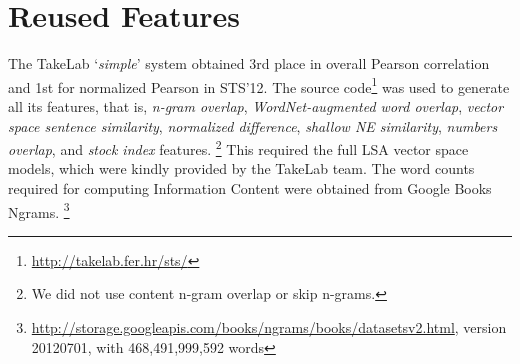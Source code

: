\section{Reused Features}
\label{reused}

The TakeLab `\emph{simple\/}' system \citep{vsaric2012takelab} 
obtained 3rd place in overall Pearson correlation 
and 1st for normalized Pearson in STS'12.
The source code\footnote{\url{http://takelab.fer.hr/sts/}} was used to generate 
all its features, that is,
\emph{n-gram overlap}, 
\emph{WordNet-augmented word overlap}, 
\emph{vector space sentence similarity}, 
\emph{normalized difference}, 
\emph{shallow NE similarity}, 
\emph{numbers overlap}, and 
\emph{stock index} features.%
\footnote{We did not use content n-gram overlap or skip n-grams.} 
This required the full LSA vector space models, which were kindly provided by the TakeLab team. 
The word counts required for computing Information Content were obtained from Google Books Ngrams.%
\footnote{\url{http://storage.googleapis.com/books/ngrams/books/datasetsv2.html}, 
version 20120701, with 468,491,999,592 words}


